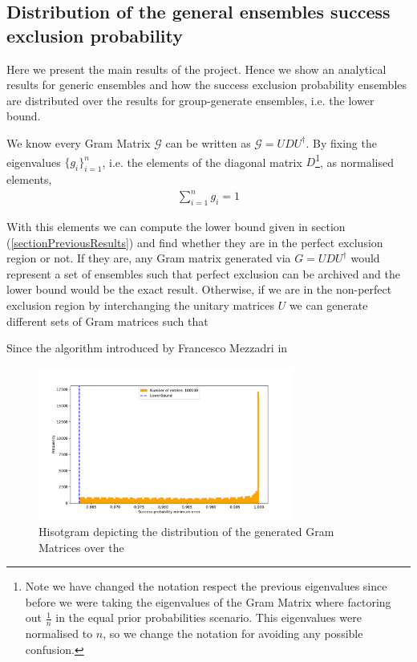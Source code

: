 \documentclass[12pt,letterpaper]{article}
\begin{document}
\subsection{Distribution of the general ensembles success exclusion probability}
Here we present the main results of the project. Hence we show an analytical results for generic ensembles and how the success exclusion probability ensembles are distributed over the results for group-generate ensembles, i.e. the lower bound.

We know every Gram Matrix $\mathcal{G}$ can be written as $\mathcal{G}=UDU^\dagger$. By fixing the eigenvalues $\{g_i\}_{i=1}^n$, i.e. the elements of the diagonal matrix $D$\footnote{Note we have changed the notation respect the previous  eigenvalues since before we were taking the eigenvalues of the Gram Matrix where factoring out $\frac{1}{n}$ in the equal prior probabilities scenario. This eigenvalues were normalised to $n$, so we change the notation for avoiding any possible confusion.}, as normalised elements,
\begin{align*}
\sum_{i=1}^ng_i=1
\end{align*}

With this elements we can compute the lower bound given in section (\ref{sectionPreviousResults}) and find whether they are in the perfect exclusion region or not. If they are, any Gram matrix generated via $G=UDU^\dagger$ would represent a set of ensembles such that perfect exclusion can be archived and the lower bound would be the exact result. Otherwise, if we are in the non-perfect exclusion region by interchanging the unitary matrices $U$ we can generate different sets of Gram matrices such that 

Since the algorithm introduced by Francesco Mezzadri in \cite{UnitaryMatricesGeneration}

\begin{figure}[H]
	\centering
	\includegraphics[width=0.75\textwidth, trim={1.0cm 0.3cm 2.4cm 1.5cm}, clip]{../Plots/ExclusionMinimumErrorRandomDistributionZ3Prob0.962.pdf}
	\caption{Hisotgram depicting the distribution of the generated Gram Matrices over the }
	\label{FigureDistZ5ME0.962}
\end{figure}
\end{document}
